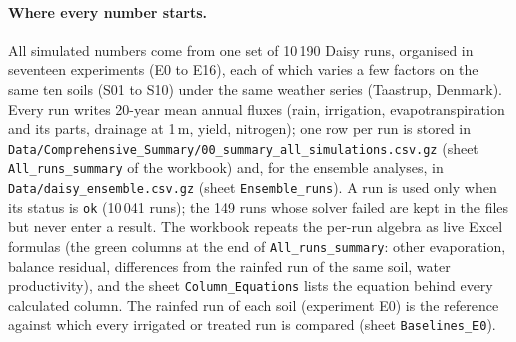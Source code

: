 \paragraph{Where every number starts.} All simulated numbers come from one set of 10\,190 Daisy runs, organised in seventeen experiments (E0 to E16), each of which varies a few factors on the same ten soils (S01 to S10) under the same weather series (Taastrup, Denmark). Every run writes 20-year mean annual fluxes (rain, irrigation, evapotranspiration and its parts, drainage at 1\,m, yield, nitrogen); one row per run is stored in \nolinkurl{Data/Comprehensive_Summary/00_summary_all_simulations.csv.gz} (sheet \texttt{All\_runs\_summary} of the workbook) and, for the ensemble analyses, in \nolinkurl{Data/daisy_ensemble.csv.gz} (sheet \texttt{Ensemble\_runs}). A run is used only when its status is \texttt{ok} (10\,041 runs); the 149 runs whose solver failed are kept in the files but never enter a result. The workbook repeats the per-run algebra as live Excel formulas (the green columns at the end of \texttt{All\_runs\_summary}: other evaporation, balance residual, differences from the rainfed run of the same soil, water productivity), and the sheet \texttt{Column\_Equations} lists the equation behind every calculated column. The rainfed run of each soil (experiment E0) is the reference against which every irrigated or treated run is compared (sheet \texttt{Baselines\_E0}).
